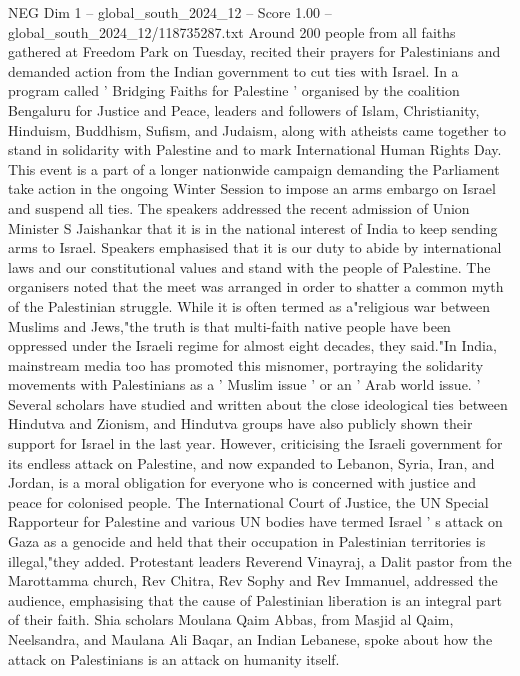 \begin{textsample}{NEG Dim 1 – global\_south\_2024\_12 – Score 1.00 – global\_south\_2024\_12/118735287.txt}  \label{ex:f1_neg_266}
Around 200 people from all faiths gathered at Freedom Park on Tuesday, recited their prayers for Palestinians and demanded action from the Indian government to cut ties with Israel.
In a program called ' Bridging Faiths for Palestine ' organised by the coalition Bengaluru for Justice and Peace, leaders and followers of Islam, Christianity, Hinduism, Buddhism, Sufism, and Judaism, along with atheists came together to stand in solidarity with Palestine and to mark International Human Rights Day.
This event is a part of a longer nationwide campaign demanding the Parliament take action in the ongoing Winter Session to impose an arms embargo on Israel and suspend all ties.
The speakers addressed the recent admission of Union Minister S Jaishankar that it is in the national interest of India to keep sending arms to Israel.
Speakers emphasised that it is our duty to abide by international laws and our constitutional values and stand with the people of Palestine.
The organisers noted that the meet was arranged in order to shatter a common myth of the Palestinian struggle.
While it is often termed as a"religious war between Muslims and Jews,"the truth is that multi-faith native people have been oppressed under the Israeli regime for almost eight decades, they said."In India, mainstream media too has promoted this misnomer, portraying the solidarity movements with Palestinians as a ' Muslim issue ' or an ' Arab world issue. ' Several scholars have studied and written about the close ideological ties between Hindutva and Zionism, and Hindutva groups have also publicly shown their support for Israel in the last year.
However, criticising the Israeli government for its endless attack on Palestine, and now expanded to Lebanon, Syria, Iran, and Jordan, is a moral obligation for everyone who is concerned with justice and peace for colonised people.
The International Court of Justice, the UN Special Rapporteur for Palestine and various UN bodies have termed Israel ' s attack on Gaza as a genocide and held that their occupation in Palestinian territories is illegal,"they added.
Protestant leaders Reverend Vinayraj, a Dalit pastor from the Marottamma church, Rev Chitra, Rev Sophy and Rev Immanuel, addressed the audience, emphasising that the cause of Palestinian liberation is an integral part of their faith.
Shia scholars Moulana Qaim Abbas, from Masjid al Qaim, Neelsandra, and Maulana Ali Baqar, an Indian Lebanese, spoke about how the attack on Palestinians is an attack on humanity itself.

\end{textsample}
